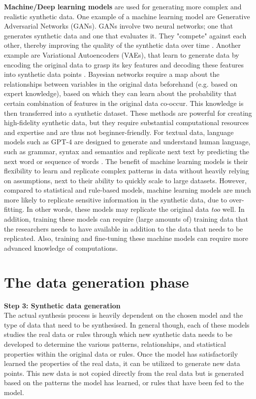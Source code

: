 \textbf{Machine/Deep learning models} are used for generating more complex and realistic synthetic data. One example of a machine learning model are Generative Adversarial Networks (GANs). GANs involve two neural networks; one that generates synthetic data and one that evaluates it. They "compete" against each other, thereby improving the quality of the synthetic data over time \cite{wang2017generative}. Another example are Variational Autoencoders (VAEs), that learn to generate data by encoding the original data to grasp its key features and decoding these features into synthetic data points \cite{doersch2016tutorial,wan2017variational}. Bayesian networks require a map about the relationships between variables in the original data beforehand (e.g. based on expert knowledge), based on which they can learn about the probability that certain combination of features in the original data co-occur. This knowledge is then transferred into a synthetic dataset. These methods are powerful for creating high-fidelity synthetic data, but they require substantial computational resources and expertise and are thus not beginner-friendly. For textual data, language models such as GPT-4 are designed to generate and understand human language, such as grammar, syntax and semantics and replicate next text by predicting the next word or sequence of words \cite{li2023synthetic}. The benefit of machine learning models is their flexibility to learn and replicate complex patterns in data without heavily relying on assumptions, next to their ability to quickly scale to large datasets. However, compared to statistical and rule-based models, machine learning models are much more likely to replicate sensitive information in the synthetic data, due to over-fitting. In other words, these models may replicate the original data \textit{too} well. In addition, training these models can require (large amounts of) training data that the researchers needs to have available in addition to the data that needs to be replicated. Also, training and fine-tuning these machine models can require more advanced knowledge of computations.



\section{The data generation phase}


\textbf{Step 3: Synthetic data generation} \\
The actual synthesis process is heavily dependent on the chosen model and the type of data that need to be synthesised. In general though, each of these models studies the real data or rules through which new synthetic data needs to be developed to determine the various patterns, relationships, and statistical properties within the original data or rules. 
Once the model has satisfactorily learned the properties of the real data, it can be utilized to generate new data points. This new data is not copied directly from the real data but is generated based on the patterns the model has learned, or rules that have been fed to the model. 

